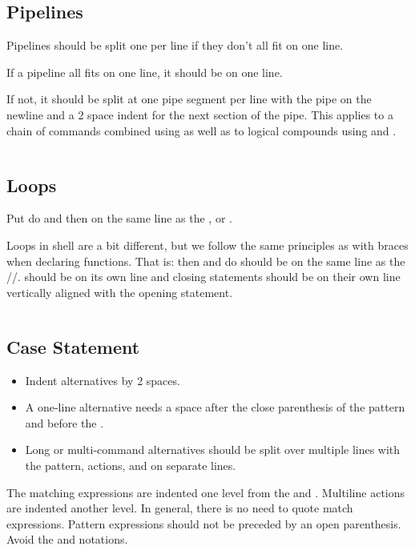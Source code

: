 \documentclass{article}
\begin{document}
\subsection{Pipelines}
\label{subsec:pipelines}
Pipelines should be split one per line if they don’t all fit on one line.

If a pipeline all fits on one line, it should be on one line.

If not, it should be split at one pipe segment per line with the pipe on the newline and a 2 space indent for the next section of the pipe. This applies to a chain of commands combined using \code{|} as well as to logical compounds using \code{||} and \code{\&\&}.

\inputminted[frame=single,firstline=62, lastline=69,linenos]{bash}{./styleguide.bash}

\subsection{Loops}
\label{subsec:loops}
Put \code{;} do and \code{;} then on the same line as the ,  or .

Loops in shell are a bit different, but we follow the same principles as with braces when declaring functions. That is: \code{;} then and \code{;} do should be on the same line as the //.  should be on its own line and closing statements should be on their own line vertically aligned with the opening statement.

\inputminted[frame=single,firstline=70, lastline=87,linenos]{bash}{./styleguide.bash}

\subsection{Case Statement}
\label{subsec:case_state}
\begin{itemize}
    \item Indent alternatives by 2 spaces.
    \item A one-line alternative needs a space after the close parenthesis of the pattern and before the \code{;;}.
    \item Long or multi-command alternatives should be split over multiple lines with the pattern, actions, and \code{;;} on separate lines.
\end{itemize}


The matching expressions are indented one level from the  and . Multiline actions are indented another level. In general, there is no need to quote match expressions. Pattern expressions should not be preceded by an open parenthesis. Avoid the \code{;\&} and \code{;;\&} notations.
\end{document}
